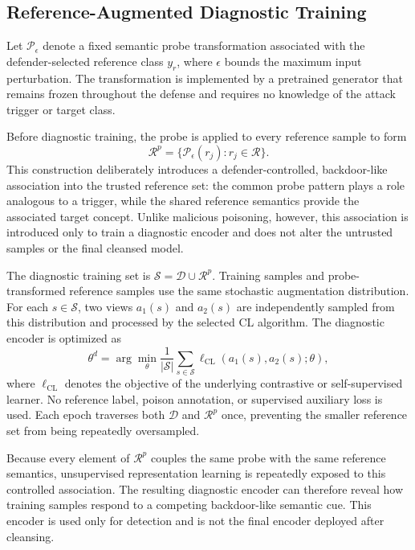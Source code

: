 \documentclass[10pt,journal]{IEEEtran}
\begin{document}
\subsection{Reference-Augmented Diagnostic Training}
\label{sec:diagnostic_training}

Let $\mathcal{P}_{\epsilon}$ denote a fixed semantic probe transformation
associated with the defender-selected reference class $y_r$, where
$\epsilon$ bounds the maximum input perturbation. The transformation is
implemented by a pretrained generator that remains frozen throughout
the defense and requires no knowledge of the attack trigger or target
class.

Before diagnostic training, the probe is applied to every reference
sample to form
\begin{equation}
    \mathcal{R}^{p}
    =
    \{\mathcal{P}_{\epsilon}(r_j):r_j\in\mathcal{R}\}.
    \label{eq:probed_reference_set}
\end{equation}
This construction deliberately introduces a defender-controlled,
backdoor-like association into the trusted reference set: the common
probe pattern plays a role analogous to a trigger, while the shared
reference semantics provide the associated target concept. Unlike
malicious poisoning, however, this association is introduced only to
train a diagnostic encoder and does not alter the untrusted samples or
the final cleansed model.

The diagnostic training set is
$\mathcal{S}=\mathcal{D}\cup\mathcal{R}^{p}$. Training samples and
probe-transformed reference samples use the same stochastic
augmentation distribution. For each $s\in\mathcal{S}$, two views
$a_1(s)$ and $a_2(s)$ are independently sampled from this distribution
and processed by the selected CL algorithm. The diagnostic encoder is
optimized as
\begin{equation}
    \theta^{d}
    =
    \arg\min_{\theta}
    \frac{1}{|\mathcal{S}|}
    \sum_{s\in\mathcal{S}}
    \ell_{\mathrm{CL}}
    \left(a_1(s),a_2(s);\theta\right),
    \label{eq:diagnostic_objective}
\end{equation}
where $\ell_{\mathrm{CL}}$ denotes the objective of the underlying
contrastive or self-supervised learner. No reference label, poison
annotation, or supervised auxiliary loss is used. Each epoch traverses
both $\mathcal{D}$ and $\mathcal{R}^{p}$ once, preventing the smaller
reference set from being repeatedly oversampled.

Because every element of $\mathcal{R}^{p}$ couples the same probe with
the same reference semantics, unsupervised representation learning is
repeatedly exposed to this controlled association. The resulting
diagnostic encoder can therefore reveal how training samples respond to
a competing backdoor-like semantic cue. This encoder is used only for
detection and is not the final encoder deployed after cleansing.
\end{document}

